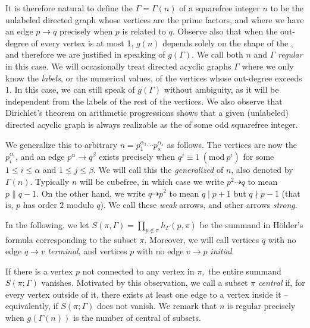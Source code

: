 \documentclass{article}
\newcommand{\ufdsh}{p_1^{\alpha_1} \cdots p_s^{\alpha_s}}
\newcommand{\Mod}[1]{\ (\mathrm{mod} \ #1)}
\theoremstyle{plain}
\theoremstyle{definition}
\begin{document}
It is therefore natural to define the \emph{} $\Gamma = \Gamma(n)$ of a squarefree integer $n$ to be the unlabeled directed graph whose vertices are the prime factors, and where we have an edge $p \rightarrow q$ precisely when $p$ is related to $q$. Observe also that when the out-degree of every vertex is at most 1, $g(n)$ depends solely on the shape of the , and therefore we are justified in speaking of $g(\Gamma).$ We call both $n$ and $\Gamma$ \emph{regular} in this case. We will occasionally treat directed acyclic graphs $\Gamma$ where we only know the \emph{labels}, or the numerical values, of the vertices whose out-degree exceeds $1$. In this case, we can still speak of $g(\Gamma)$ without ambiguity, as it will be independent from the labels of the rest of the vertices. We also observe that Dirichlet's theorem on arithmetic progressions shows that a given (unlabeled) directed acyclic graph is always realizable as the  of some odd squarefree integer.

We generalize this to arbitrary $n = \ufdsh$ as follows. The vertices are now the $p_i^{\alpha_i}$, and an edge $p^\alpha \rightarrow q^\beta$ exists precisely when $q^j \equiv 1 \Mod{p^i}$ for some $1 \le i \le \alpha$ and $1 \le j \le \beta$. We will call this the \emph{generalized \hg} of $n$, also denoted by $\Gamma(n)$. Typically $n$ will be cubefree, in which case we write $p^2 \dashrightarrow q$ to mean $p \parallel q - 1$. On the other hand, we write $q \dashrightarrow p^2$ to mean $q \mid p + 1$ but $q \nmid p - 1$ (that is, $p$ has order $2$ modulo $q$). We call these \emph{weak} arrows, and other arrows \emph{strong}.

In the following, we let $S(\pi, \Gamma) = \prod_{p \notin \pi}h_\Gamma(p, \pi)$ be the summand in Hölder's formula corresponding to the subset $\pi$. Moreover, we will call vertices $q$ with no edge $q \rightarrow v$ \emph{terminal}, and vertices $p$ with no edge $v \rightarrow p$ \emph{initial}.

If there is a vertex $p$ not connected to any vertex in $\pi,$ the entire summand $S(\pi; \Gamma)$ vanishes. Motivated by this observation, we call a subset $\pi$ \emph{central} if, for every vertex outside of it, there exists at least one edge to a vertex inside it -- equivalently, if $S(\pi; \Gamma)$ does not vanish. We remark that $n$ is regular precisely when $g(\Gamma(n))$ is the number of central of subsets.
\end{document}
